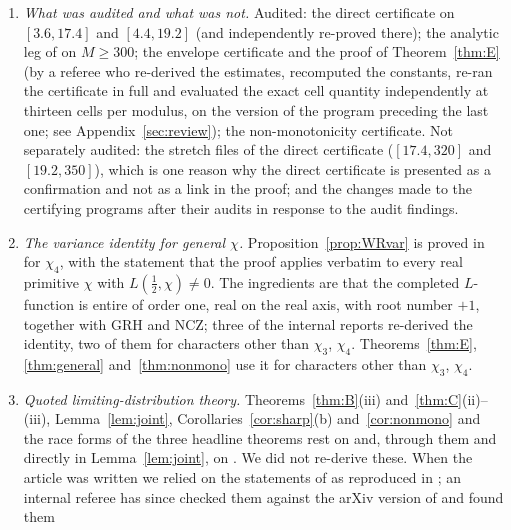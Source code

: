\documentclass[11pt]{amsart}
\theoremstyle{definition}
\numberwithin{equation}{section}
\begin{document}
\begin{enumerate}
(iii) and (iv) of the General Theorem, is not free of computation
either: its proof ends with the four numerical inequalities
\eqref{eq:Evalues} between explicit values of elementary functions,
$\psi$ and $J_0$. They were evaluated in ball arithmetic and
recomputed in floating point at $30$ digits
(Section~\ref{sec:numerics}(6)); they involve no zero data and could
be checked by hand, which we have not done.
\item \emph{What was audited and what was not.} Audited: the direct
certificate on $[3.6,17.4]$ and $[4.4,19.2]$ (and independently
re-proved there); the analytic leg of \cite{WR} on $M\ge300$; the
envelope certificate and the proof of Theorem~\ref{thm:E} (by a
referee who re-derived the estimates, recomputed the constants, re-ran
the certificate in full and evaluated the exact cell quantity
independently at thirteen cells per modulus, on the version of the
program preceding the last one; see Appendix~\ref{sec:review}); the
non-monotonicity certificate. Not separately audited: the stretch
files of the direct certificate ($[17.4,320]$ and $[19.2,350]$), which
is one reason why the direct certificate is presented as a
confirmation and not as a link in the proof; and the changes made to
the certifying programs after their audits in response to the audit
findings.
\item \emph{The variance identity for general $\chi$.}
Proposition~\ref{prop:WRvar} is proved in \cite{WR} for $\chi_4$, with
the statement that the proof applies verbatim to every real primitive
$\chi$ with $L(\tfrac12,\chi)\ne0$. The ingredients are that the
completed $L$-function is entire of order one, real on the real axis,
with root number $+1$, together with GRH and NCZ; three of the
internal reports re-derived the identity, two of them for characters
other than $\chi_3$, $\chi_4$. Theorems~\ref{thm:E}, \ref{thm:general}
and~\ref{thm:nonmono} use it for characters other than $\chi_3$,
$\chi_4$.
\item \emph{Quoted limiting-distribution theory.}
Theorems~\ref{thm:B}(iii) and~\ref{thm:C}(ii)--(iii),
Lemma~\ref{lem:joint}, Corollaries~\ref{cor:sharp}(b)
and~\ref{cor:nonmono} and the race forms of the three headline
theorems rest on \cite[Theorem~1, Proposition~1]{WR} and, through
them and directly in Lemma~\ref{lem:joint}, on
\cite[Corollary~1.3(a), Theorem~1.9]{ANS14}. We did not re-derive
these. When the article was written we relied on the statements of
\cite{ANS14} as reproduced in \cite{WR}; an internal referee has since
checked them against the arXiv version of \cite{ANS14} and found them

\end{enumerate}
\end{document}
